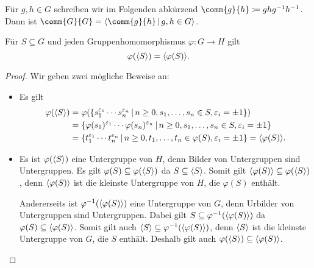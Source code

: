 \section{}

Für $g, h \in G$ schreiben wir im Folgenden abkürzend $\comm{g}{h} \coloneqq ghg^{-1}h^{-1}$.
Dann ist $\comm{G}{G} = \generated{ \comm{g}{h} \suchthat g, h \in G }$.

\begin{lemma}
  Für $S \subseteq G$ und jeden Gruppenhomomorphismus $\varphi \colon G \to H$ gilt
  \[
      \varphi( \langle S\rangle )
    = \langle \varphi(S) \rangle.
  \]
\end{lemma}

\begin{proof}
  Wir geben zwei mögliche Beweise an:
  \begin{itemize}
    \item
      Es gilt
      \begin{align*}
            \varphi( \generated{S} )
        &=  \varphi(\{
                      s_1^{\varepsilon_1} \dotsm s_n^{\varepsilon_n}
                    \suchthat 
                      n \geq 0,
                      s_1, \dotsc, s_n \in S,
                      \varepsilon_i = \pm 1
                    \})
        \\
        &=  \{
              \varphi(s_1)^{\varepsilon_1} \dotsm \varphi(s_n)^{\varepsilon_n}
            \suchthat 
              n \geq 0,
              s_1, \dotsc, s_n \in S,
              \varepsilon_i = \pm 1
            \}
        \\
        &=  \{
              t_1^{\varepsilon_1} \dotsm t_n^{\varepsilon_n}
            \suchthat 
              n \geq 0,
              t_1, \dotsc, t_n \in \varphi(S),
              \varepsilon_i = \pm 1
            \}
        =  \generated{ \varphi(S) }.
      \end{align*}
      
    \item
      Es ist $\varphi(\langle S\rangle)$ eine Untergruppe von $H$, denn Bilder von Untergruppen sind Untergruppen.
      Es gilt $\varphi(S) \subseteq \varphi(\langle S\rangle)$ da $S \subseteq \langle S\rangle$.
      Somit gilt $\langle\varphi(S)\rangle \subseteq \varphi(\langle S\rangle)$, denn $\langle\varphi(S)\rangle$ ist die kleinste Untergruppe von $H$, die $\varphi(S)$ enthält.
      
      Andererseits ist $\varphi^{-1}(\langle\varphi(S)\rangle)$ eine Untergruppe von $G$, denn Urbilder von Untergruppen sind Untergruppen.
      Dabei gilt $S \subseteq \varphi^{-1}(\langle\varphi(S)\rangle)$ da $\varphi(S) \subseteq \langle\varphi(S)\rangle$.
      Somit gilt auch $\langle S\rangle \subseteq \varphi^{-1}(\langle\varphi(S)\rangle)$, denn $\langle S\rangle$ ist die kleinste Untergruppe von $G$, die $S$ enthält.
      Deshalb gilt auch $\varphi(\langle S\rangle) \subseteq \langle\varphi(S)\rangle$.
    \qedhere
  \end{itemize}
\end{proof}





